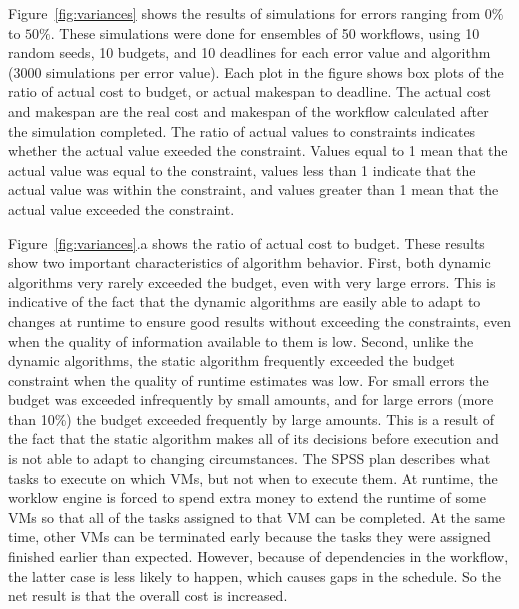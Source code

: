\documentclass[conference]{IEEEtran}
\begin{document}
Figure~\ref{fig:variances} shows the results of simulations for errors ranging from $0\%$ to $50\%$. These simulations were done for ensembles of 50 workflows, using 10 random seeds, 10 budgets, and 10 deadlines for each error value and algorithm (3000 simulations per error value). Each plot in the figure shows box plots of the ratio of actual cost to budget, or actual makespan to deadline. The actual cost and makespan are the real cost and makespan of the workflow calculated after the simulation completed. The ratio of actual values to constraints indicates whether the actual value exeeded the constraint. Values equal to 1 mean that the actual value was equal to the constraint, values less than 1 indicate that the actual value was within the constraint, and values greater than 1 mean that the actual value exceeded the constraint.

Figure~\ref{fig:variances}.a shows the ratio of actual cost to budget. These results show two important characteristics of algorithm behavior. First, both dynamic algorithms very rarely exceeded the budget, even with very large errors. This is indicative of the fact that the dynamic algorithms are easily able to adapt to changes at runtime to ensure good results without exceeding the constraints, even when the quality of information available to them is low. Second, unlike the dynamic algorithms, the static algorithm frequently exceeded the budget constraint when the quality of runtime estimates was low. For small errors the budget was exceeded infrequently by small amounts, and for large errors (more than 10\%) the budget exceeded frequently by large amounts. This is a result of the fact that the static algorithm makes all of its decisions before execution and is not able to adapt to changing circumstances. The SPSS plan describes what tasks to execute on which VMs, but not when to execute them. At runtime, the worklow engine is forced to spend extra money to extend the runtime of some VMs so that all of the tasks assigned to that VM can be completed. At the same time, other VMs can be terminated early because the tasks they were assigned finished earlier than expected. However, because of dependencies in the workflow, the latter case is less likely to happen, which causes gaps in the schedule. So the net result is that the overall cost is increased.
\end{document}
